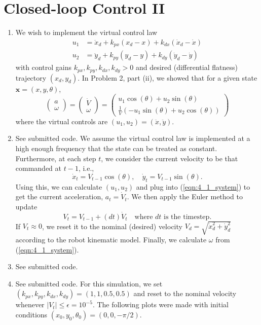 \documentclass[12pt]{article}
\begin{document}
\section{Closed-loop Control II}
\begin{enumerate}
	\item We wish to implement the virtual control law
	\begin{align*}
		u_1 &= \ddot x_d + k_{px}(x_d - x) + k_{dx}(\dot x_d - \dot x) \\
		u_2 &= \ddot y_d + k_{py}(y_d - y) + k_{dy}(\dot y_d - \dot y)
	\end{align*}
	with control gains $k_{px}, k_{py}, k_{dx}, k_{dy} > 0$ and desired (differential flatness) trajectory $(x_d,y_d)$. In Problem 2, part (ii), we showed that for a given state $\mathbf{x} = (x,y,\theta)$,
	\begin{equation}\label{eqn:4_1_system}
		\left(\begin{array}{c}
		a \\
		\omega
		\end{array}\right) =
		\left(\begin{array}{c}
		\dot V \\
		\omega
		\end{array}\right) =
		\left(\begin{array}{c}
		u_1\cos(\theta) + u_2\sin(\theta) \\
		\frac{1}{V}(-u_1\sin(\theta) + u_2\cos(\theta))
		\end{array}\right)
	\end{equation}
	where the virtual controls are $(u_1,u_2) = (\ddot x, \ddot y)$.
	\item See submitted code. We assume the virtual control law is implemented at a high enough frequency that the state can be treated as constant. Furthermore, at each step $t$, we consider the current velocity to be that commanded at $t-1$, i.e.,
	\[
		\dot x_t = V_{t-1}\cos(\theta), \quad \dot y_t = V_{t-1}\sin(\theta).
	\]
	Using this, we can calculate $(u_1,u_2)$ and plug into (\ref{eqn:4_1_system}) to get the current acceleration, $a_t = \dot V_t$. We then apply the Euler method to update
	\[
		V_t = V_{t-1} + (dt)\dot V_t \quad \mbox{where $dt$ is the timestep}.
	\]
	If $V_t \approx 0$, we reset it to the nominal (desired) velocity $V_d = \sqrt{\dot x_d^2 + \dot y_d^2}$ according to the robot kinematic model. Finally, we calculate $\omega$ from (\ref{eqn:4_1_system}).
	\item See submitted code.
	\item See submitted code. For this simulation, we set $(k_{px}, k_{py}, k_{dx}, k_{dy}) = (1,1,0.5,0.5)$ and reset to the nominal velocity whenever $|V_t| \leq \epsilon = 10^{-5}$. The following plots were made with initial conditions $(x_0,y_0,\theta_0) = (0,0,-\pi/2)$.

\end{enumerate}
\end{document}
